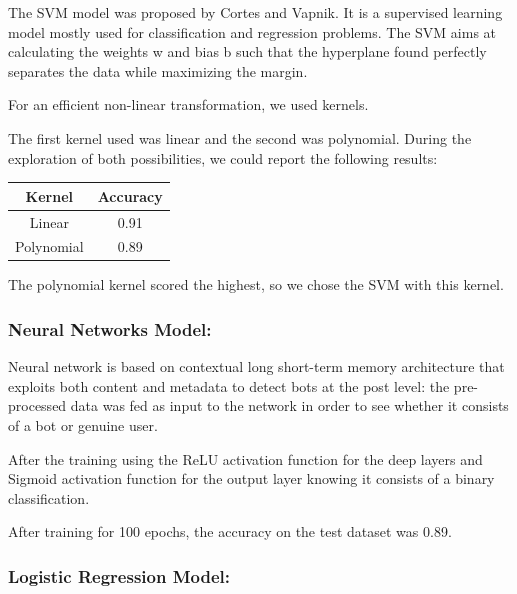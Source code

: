 \documentclass{article}
\begin{document}
    The SVM model was proposed by Cortes and Vapnik. It is a supervised learning model mostly used for classification and regression problems. The SVM aims at calculating the weights w and bias b such that the hyperplane found perfectly separates the data while maximizing the margin.
    
    For an efficient non-linear transformation, we used kernels.
    
    The first kernel used was linear and the second was polynomial. During the exploration of both possibilities, we could report the following results:
    
    \begin{center}
    \begin{tabular}{||c c||} 
     \hline
     Kernel & Accuracy    \\ [0.5ex] 
     \hline\hline
     Linear & 0.91  \\ 
     \hline
     Polynomial & 0.89  \\
     \hline
    \end{tabular}
    \end{center}
    
    The polynomial kernel scored the highest, so we chose the SVM with this kernel.
       

    \subsubsection{Neural Networks Model:}
    
    Neural network is based on contextual long short-term memory architecture that exploits both content and metadata to detect bots at the post level: the pre-processed data was fed as  input to the network in order to see whether it consists of a bot or genuine user. 
    
    After the training using the ReLU activation function for the deep layers and Sigmoid activation function for the output layer knowing it consists of a binary classification.
    
    After training for 100 epochs, the accuracy on the test dataset was 0.89.
    
    \subsubsection{Logistic Regression Model:}
    
\end{document}
